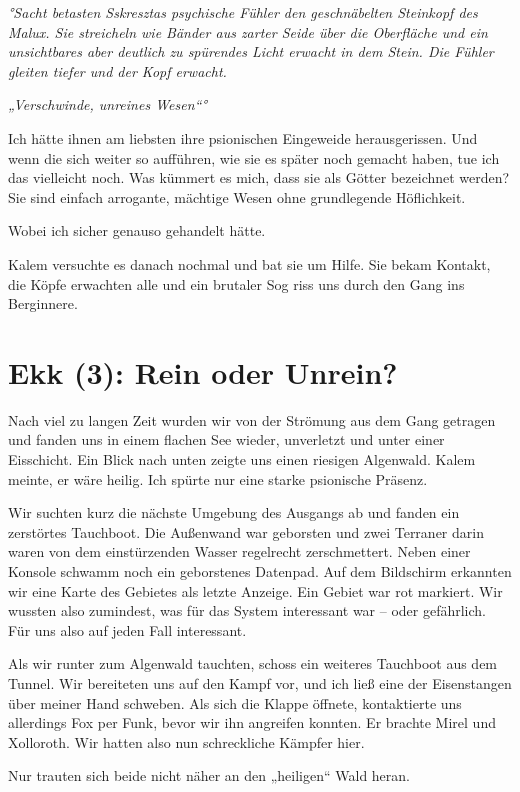 \documentclass[11pt]{scrartcl}
\begin{document}
\emph{°Sacht betasten Sskresztas psychische Fühler den geschnäbelten
Steinkopf des Malux. Sie streicheln wie Bänder aus zarter Seide über die
Oberfläche und ein unsichtbares aber deutlich zu spürendes Licht erwacht
in dem Stein. Die Fühler gleiten tiefer und der Kopf erwacht.}

\emph{„Verschwinde, unreines Wesen``°}

Ich hätte ihnen am liebsten ihre psionischen Eingeweide herausgerissen.
Und wenn die sich weiter so aufführen, wie sie es später noch gemacht
haben, tue ich das vielleicht noch. Was kümmert es mich, dass sie als
Götter bezeichnet werden? Sie sind einfach arrogante, mächtige Wesen
ohne grundlegende Höflichkeit.

Wobei ich sicher genauso gehandelt hätte.

Kalem versuchte es danach nochmal und bat sie um Hilfe. Sie bekam
Kontakt, die Köpfe erwachten alle und ein brutaler Sog riss uns durch
den Gang ins Berginnere.

\section{Ekk (3): Rein oder Unrein?}

Nach viel zu langen Zeit wurden wir von der Strömung aus dem Gang
getragen und fanden uns in einem flachen See wieder, unverletzt und
unter einer Eisschicht. Ein Blick nach unten zeigte uns einen riesigen
Algenwald. Kalem meinte, er wäre heilig. Ich spürte nur eine starke
psionische Präsenz.

Wir suchten kurz die nächste Umgebung des Ausgangs ab und fanden ein
zerstörtes Tauchboot. Die Außenwand war geborsten und zwei Terraner
darin waren von dem einstürzenden Wasser regelrecht zerschmettert. Neben
einer Konsole schwamm noch ein geborstenes Datenpad. Auf dem Bildschirm
erkannten wir eine Karte des Gebietes als letzte Anzeige. Ein Gebiet war
rot markiert. Wir wussten also zumindest, was für das System interessant
war -- oder gefährlich. Für uns also auf jeden Fall interessant.

Als wir runter zum Algenwald tauchten, schoss ein weiteres Tauchboot aus
dem Tunnel. Wir bereiteten uns auf den Kampf vor, und ich ließ eine der
Eisenstangen über meiner Hand schweben. Als sich die Klappe öffnete,
kontaktierte uns allerdings Fox per Funk, bevor wir ihn angreifen
konnten. Er brachte Mirel und Xolloroth. Wir hatten also nun
schreckliche Kämpfer hier.

Nur trauten sich beide nicht näher an den „heiligen`` Wald heran.
\end{document}
